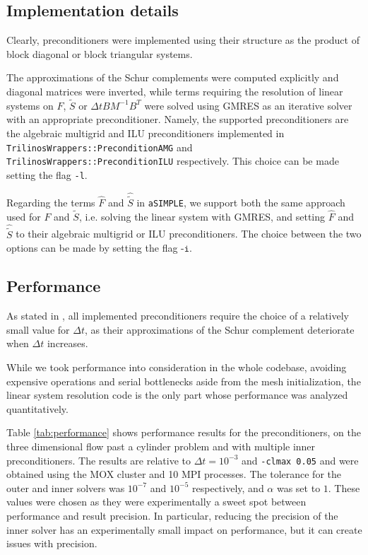 \subsection{Implementation details}
Clearly, preconditioners were implemented using their structure as the product of block diagonal or block triangular systems. 

The approximations of the Schur complements were computed explicitly and diagonal matrices were inverted, while terms requiring the resolution of linear systems on $F$, $\tilde{S}$ or $\Delta t B M^{-1} B^T$ were solved using GMRES as an iterative solver with an appropriate preconditioner. Namely, the supported preconditioners are the algebraic multigrid and ILU preconditioners implemented in \texttt{Trilinos\-Wrappers::\-PreconditionAMG} and \texttt{Trilinos\-Wrappers::\-PreconditionILU} respectively. This choice can be made setting the flag \texttt{-l}.

Regarding the terms $\hat{F}$ and $\hat{\tilde{S}}$ in \texttt{aSIMPLE}, we support both the same approach used for $F$ and $\tilde{S}$, i.e. solving the linear system with GMRES, and setting $\hat{F}$ and $\hat{\tilde{S}}$ to their algebraic multigrid or ILU preconditioners. The choice between the two options can be made by setting the flag $\texttt{-i}$.

\subsection{Performance}
As stated in \cite{Quarteroni}, all implemented preconditioners require the choice of a relatively small value for $\Delta t$, as their approximations of the Schur complement deteriorate when $\Delta t$ increases.

While we took performance into consideration in the whole codebase, avoiding expensive operations and serial bottlenecks aside from the mesh initialization, the linear system resolution code is the only part whose performance was analyzed quantitatively.

Table \ref{tab:performance} shows performance results for the preconditioners, on the three dimensional flow past a cylinder problem and with multiple inner preconditioners. The results are relative to $\Delta t = 10^{-3}$ and \texttt{-clmax 0.05} and were obtained using the MOX cluster and 10 MPI processes. The tolerance for the outer and inner solvers was $10^{-7}$ and $10^{-5}$ respectively, and $\alpha$ was set to $1$. These values were chosen as they were experimentally a sweet spot between performance and result precision. In particular, reducing the precision of the inner solver has an experimentally small impact on performance, but it can create issues with precision.

